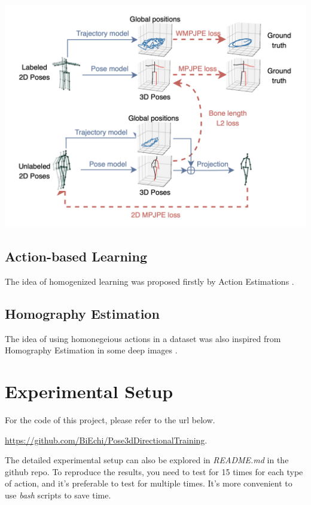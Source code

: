 \documentclass[10pt,twocolumn,letterpaper]{article}
\begin{document}
\includegraphics[scale=0.25]{original.png}



\subsection{Action-based Learning}

The idea of homogenized learning was proposed firstly by Action Estimations \cite{yao2012coupled,wang2013action}.



\subsection{Homography Estimation}

The idea of using homonegeious actions in a dataset was also inspired from Homography Estimation
in some deep images \cite{detone2016deep}. 



\section{Experimental Setup}

For the code of this project, please refer to the url below.

 \url{https://github.com/BiEchi/Pose3dDirectionalTraining}. 
 
The detailed experimental setup can also be explored in \textit{README.md} in the github repo. To reproduce
the results, you need to test for 15 times for each type of action, and it's preferable to test for multiple
times. It's more convenient to use \textit{bash} scripts to save time.
\end{document}
